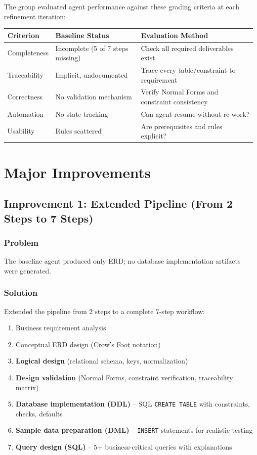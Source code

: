 \documentclass[12pt,a4paper]{article}
\begin{document}
The group evaluated agent performance against these grading criteria at each refinement iteration:

\begin{table}[h]
\centering
\begin{tabular}{|p{3cm}|p{4cm}|p{4cm}|}
\hline
\textbf{Criterion} & \textbf{Baseline Status} & \textbf{Evaluation Method} \\
\hline
Completeness & Incomplete (5 of 7 steps missing) & Check all required deliverables exist \\
\hline
Traceability & Implicit, undocumented & Trace every table/constraint to requirement \\
\hline
Correctness & No validation mechanism & Verify Normal Forms and constraint consistency \\
\hline
Automation & No state tracking & Can agent resume without re-work? \\
\hline
Usability & Rules scattered & Are prerequisites and rules explicit? \\
\hline
\end{tabular}
\end{table}

\newpage

\section{Major Improvements}

\subsection{Improvement 1: Extended Pipeline (From 2 Steps to 7 Steps)}

\subsubsection{Problem}
The baseline agent produced only ERD; no database implementation artifacts were generated.

\subsubsection{Solution}
Extended the pipeline from 2 steps to a complete 7-step workflow:

\begin{enumerate}
    \item Business requirement analysis
    \item Conceptual ERD design (Crow's Foot notation)
    \item \textbf{Logical design} (relational schema, keys, normalization)
    \item \textbf{Design validation} (Normal Forms, constraint verification, traceability matrix)
    \item \textbf{Database implementation (DDL)} -- SQL \texttt{CREATE TABLE} with constraints, checks, defaults
    \item \textbf{Sample data preparation (DML)} -- \texttt{INSERT} statements for realistic testing
    \item \textbf{Query design (SQL)} -- 5+ business-critical queries with explanations
\end{enumerate}
\end{document}

